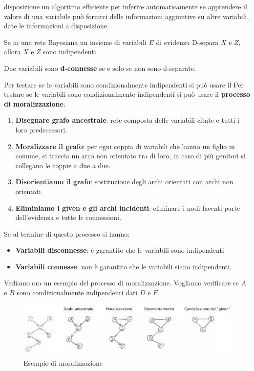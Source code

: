 disposizione un algoritmo efficiente per inferire automaticamente se apprendere
il valore di una variabile può fornirci delle informazioni aggiuntive su altre
variabili, date le informazioni a disposizione.
\begin{teorema} 
    Se in una rete Bayesiana un insieme di variabili $E$ di evidenza D-separa
    $X$ e $Z$, allora $X$ e $Z$ sono indipendenti.
\end{teorema}
\begin{definizione}
    Due variabili sono \textbf{d-connesse} se e solo se non sono d-separate.
\end{definizione}
Per testare se le variabili sono condizionalmente indipendenti si può usare il
Per testare se le variabili sono condizionalmente indipendenti si può usare il
\textbf{processo di moralizzazione}:
\begin{enumerate}
    \item \textbf{Disegnare grafo ancestrale}: rete composta delle variabili
          citate e tutti i loro predecessori.
    \item \textbf{Moralizzare il grafo}: per ogni coppia di variabili che hanno
          un figlio in comune, si traccia un arco non orientato tra di loro, in
          caso di più genitori si collegano le coppie a due a due.
    \item \textbf{Disorientiamo il grafo}: sostituzione degli archi orientati
          con archi non orientati
    \item \textbf{Eliminiamo i given e gli archi incidenti}: eliminare i nodi
          facenti parte dell'evidenza e tutte le connessioni.
\end{enumerate}
Se al termine di questo processo si hanno:
\begin{itemize}
    \item \textbf{Variabili disconnesse}: è garantito che le variabili sono
          indipendenti
    \item \textbf{Variabili connesse}: non è garantito che le variabili siano
          indipendenti.
\end{itemize}
\begin{esempio}
    Vediamo ora un esempio del processo di moralizzazione. Vogliamo verificare
    se $A$ e $B$ sono condizionalmente indipendenti dati $D$ e $F$.
    \begin{figure}[!ht]
        \centering
        \includegraphics[width=1\textwidth]{./img/Reti/Moralizzazione.png}
        \caption{Esempio di moralizzazione}
        \label{fig:moralizzazione}
    \end{figure}
\end{esempio}
